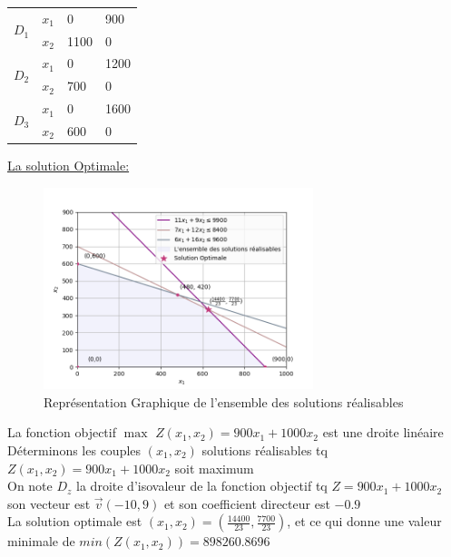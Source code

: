 \documentclass[]{book}
\begin{document}
\begin{center}
    \begin{tabular}{ | m{0.5cm} | m{0.5cm}| m{1cm} | m{1cm} | } 
      \hline
        \multirow{2}{4em}{$D_1$} & $x_1$  & 0 & 900 \\
        \cline{2-4} & $x_2$  & 1100 & 0 \\
        \hline
        
        \multirow{2}{4em}{$D_2$} & $x_1$ & 0 & 1200 \\
        \cline{2-4} & $x_2$ & 700 & 0 \\
        \hline
        
        \multirow{2}{4em}{$D_3$} & $x_1$ & 0 & 1600 \\
        \cline{2-4} & $x_2$ & 600 & 0\\
        \hline
    \end{tabular}
\end{center}

\underline{La solution Optimale:}
\begin{figure}[H]
    \centering
    \includegraphics[width=0.7\textwidth]{Figures/figure_03.png}
    \caption{Représentation Graphique de l'ensemble des solutions réalisables}
    \label{fig:placeholder}
\end{figure}
La fonction objectif $\max$ $Z(x_1,x_2) = 900x_1 + 1000x_2$ est une droite linéaire\\
Déterminons les couples $(x_1, x_2)$ solutions réalisables tq $Z(x_1,x_2) = 900x_1 + 1000x_2$ soit maximum\\
On note $D_z$ la droite d'isovaleur de la fonction objectif tq $Z = 900x_1 + 1000x_2$\\
son vecteur est $\Vec{v}(-10,9)$ et son coefficient directeur est $-0.9$\\
La solution optimale est $(x_1,x_2)=(\frac{14400}{23},\frac{7700}{23})$, et ce qui donne une valeur minimale de $min(Z(x_1,x_2)) = 898260.8696$
\end{document}
